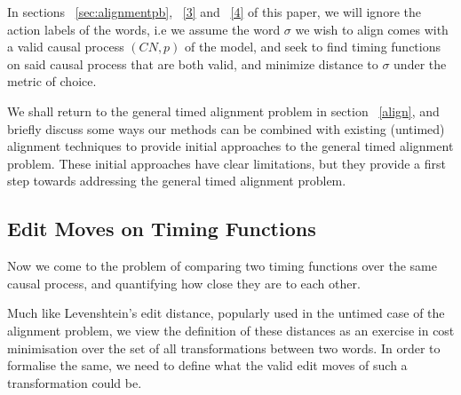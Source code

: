 \documentclass[conference]{IEEEtran}
\begin{document}
	In sections ~\ref{sec:alignmentpb}, ~\ref{3} and ~\ref{4} of this paper, we will ignore the action labels of the words, i.e we assume the word $\sigma$ we wish to align comes with a valid causal process $(CN, p)$ of the model, and seek to find timing functions on said causal process that are both valid, and minimize distance to $\sigma$ under the metric of choice. 
	
	We shall return to the general timed alignment problem in section ~\ref{align}, and briefly discuss some ways our methods can be combined with existing (untimed) alignment techniques to provide initial approaches to the general timed alignment problem. 
	These initial approaches have clear limitations, but they provide a first step towards addressing the general timed alignment problem. 
	
	\subsection{Edit Moves on Timing Functions}
	Now we come to the problem of comparing two timing functions over the same causal process, and quantifying how close they are to each other. 
	
	Much like Levenshtein's edit distance, popularly used in the untimed case of the alignment problem, we view the definition of these distances as an exercise in cost minimisation over the set of all transformations between two words. 
	In order to formalise the same, we need to define what the valid edit moves of such a transformation could be. 
	
\end{document}

